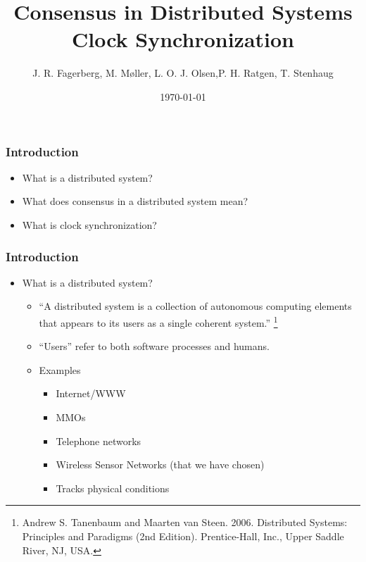 \documentclass{beamer}
\title{Consensus in Distributed Systems \\ Clock Synchronization}
\author{J. R. Fagerberg, M. Møller, L. O. J. Olsen,\newline P. H. Ratgen, T. Stenhaug}
\institute{IMADA}
\date{\today}
\begin{document}
 
\frame{\titlepage}

\begin{frame}
  \frametitle{Introduction}
  \begin{itemize}
  \item What is a distributed system?
  \item What does consensus in a distributed system mean?
  \item What is clock synchronization?
  \end{itemize}
\end{frame}
 
\begin{frame}
  \frametitle{Introduction}
  \begin{itemize}
  \item<1-> What is a distributed system?
    \begin{itemize}
    \item<2-> ``A distributed system is a collection of autonomous
      computing elements that appears to its users as a single
      coherent system.'' \footnote{Andrew S. Tanenbaum and Maarten van
        Steen. 2006. Distributed Systems: Principles and Paradigms
        (2nd Edition). Prentice-Hall, Inc., Upper Saddle River, NJ,
        USA.}
    \item<3-> ``Users'' refer to both software processes and humans.
    \item<4-> Examples
      \begin{itemize}
      \item<5-> Internet/WWW
      \item<6-> MMOs
      \item<7-> Telephone networks
      \item<8-> Wireless Sensor Networks (that we have chosen)
      \item<9-> Tracks physical conditions
      \end{itemize}
    \end{itemize}
  \end{itemize}
\end{frame}
\end{document}
